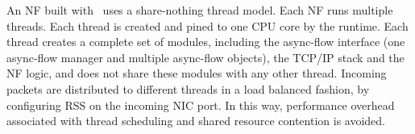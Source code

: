 An NF built with \netstar~uses a share-nothing thread model. %
Each NF runs multiple threads. Each thread is created and pined to one CPU core by the runtime. Each thread creates a complete set of modules, including the async-flow interface (one async-flow manager and multiple async-flow objects), the TCP/IP stack and the NF logic, and does not share these modules with any other thread. Incoming packets are distributed to different threads in a load balanced fashion, by configuring RSS \cite{rss} on the incoming NIC port. In this way, performance overhead associated with thread scheduling and shared resource contention is avoided. %
